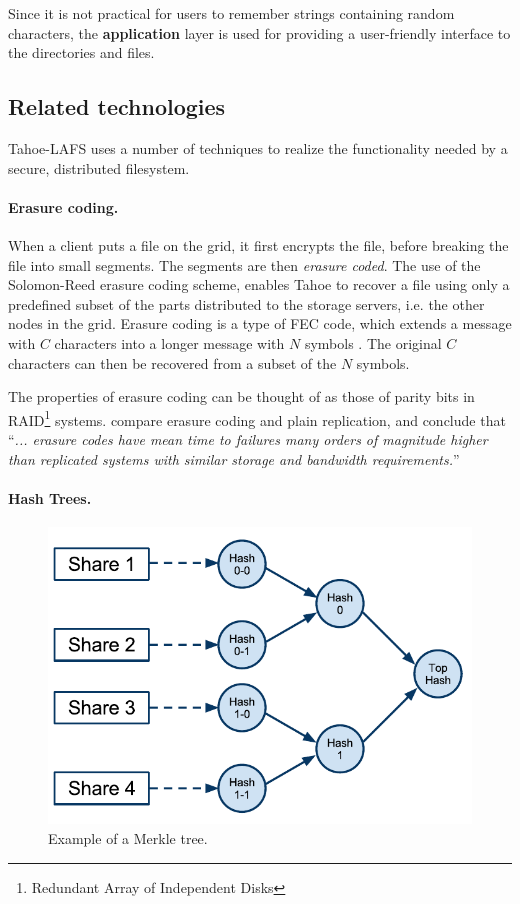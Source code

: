 \documentclass[english,12pt,a4paper]{book}
\begin{document}
Since it is not practical for users to remember strings containing random
characters, the \textbf{application} layer is used for providing a user-friendly
interface to the directories and files.

\subsection{Related technologies}

Tahoe-\ac{LAFS} uses a number of techniques to realize the functionality
needed by a secure, distributed filesystem.

\paragraph{Erasure coding.}

When a client puts a file on the grid, it first encrypts the file, before
breaking the file into small segments. The segments are then \emph{erasure
coded}.  The use of the Solomon-Reed erasure coding scheme, enables Tahoe to
recover a file using only a predefined subset of the parts distributed to the
storage servers, i.e. the other nodes in the grid. Erasure coding is a type of
\ac{FEC} code, which extends a message with $C$ characters into a longer message
with $N$ symbols \cite{t_reed-solomon}.  The original $C$ characters can then be
recovered from a subset of the $N$ symbols.

The properties of erasure coding can be thought of as those of parity bits in
RAID\footnote{Redundant Array of Independent Disks} systems. \citet*{t_erasure}
compare erasure coding and plain replication, and conclude that ``\emph{...
erasure codes have mean time to failures many orders of magnitude higher than
replicated systems with similar storage and bandwidth requirements.}''

\paragraph{Hash Trees.}

\begin{figure}[h]
    \centering
    \includegraphics[width=0.9\columnwidth]{Tahoe-MerkleTree.pdf}
    \caption{Example of a Merkle tree.}
    \label{fig:tahoemerkletree}
\end{figure}
\end{document}
